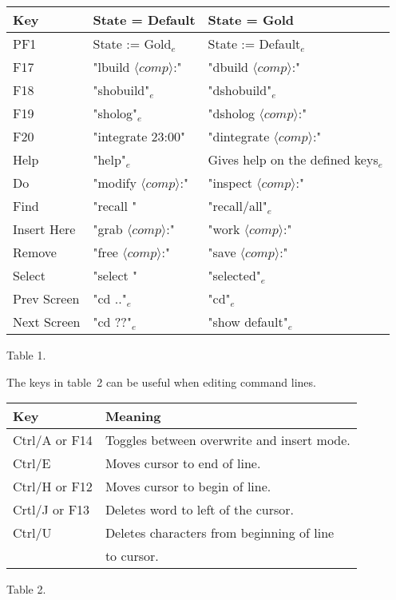 \begin{center}
\begin{tabular}{|l||l|l|}\hline
 Key       
  & State = Default             
    & State = Gold \\ \hline
 PF1   
  & State := Gold$_e$
    & State := Default$_e$              \\
 F17   
  & "lbuild $\langle comp\rangle$:"    
    & "dbuild $\langle comp\rangle$:"   \\
 F18   
  & "shobuild"$_e$          
    & "dshobuild"$_e$\\
 F19   
  & "sholog"$_e$            
    & "dsholog $\langle comp\rangle$:"  \\
 F20   
  & "integrate 23:00"   
    & "dintegrate $\langle comp\rangle$:"\\
 Help  
  & "help"$_e$              
    & Gives help on the defined keys$_e$\\
 Do    
  & "modify $\langle comp\rangle$:"    
    & "inspect $\langle comp\rangle$:"  \\
 Find  
  & "recall "           
    & "recall/all"$_e$                  \\
 Insert Here
  & "grab $\langle comp\rangle$:"      
    & "work $\langle comp\rangle$:"     \\
 Remove
  & "free $\langle comp\rangle$:"      
    & "save $\langle comp\rangle$:"     \\
 Select
  & "select "           
    & "selected"$_e$                    \\
 Prev Screen
  & "cd .."$_e$            
    & "cd"$_e$                          \\
 Next Screen
  & "cd ??"$_e$             
    & "show default"$_e$                \\ \hline
\end{tabular}\vspace{1mm}

Table 1.
\end{center}

The keys in table~2 can be useful when editing command lines.\vspace{2mm}
\begin{center}
\begin{tabular}{|l|l|}\hline
Key                       & Meaning\\ \hline
Ctrl/A or F14             & Toggles between overwrite and insert mode.\\
Ctrl/E                    & Moves cursor to end of line.\\
Ctrl/H or F12             & Moves cursor to begin of line.\\
Crtl/J\hspace{1mm} or F13 & Deletes word to left of the cursor.\\
Ctrl/U                    & Deletes characters from beginning of line \\
                          & to cursor.\\ \hline
\end{tabular}\vspace{1mm}

Table 2.
\end{center}


